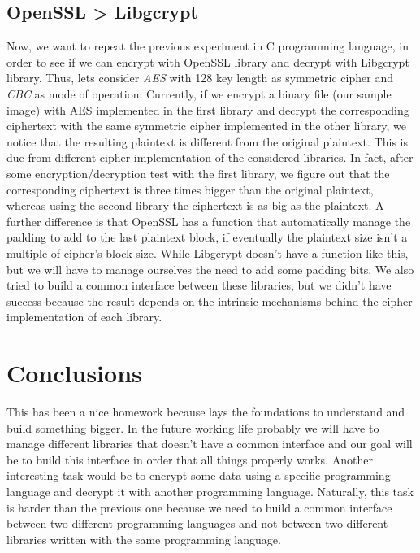 \documentclass[11pt]{article}
\begin{document}
\subsection{OpenSSL > Libgcrypt}
Now, we want to repeat the previous experiment in C programming language, in order to see if we can encrypt with OpenSSL library and decrypt with Libgcrypt library. Thus, lets consider \textit{AES} with 128 key length as symmetric cipher and \textit{CBC} as mode of operation. Currently, if we encrypt a binary file (our sample image) with AES implemented in the first library and decrypt the corresponding ciphertext with the same symmetric cipher implemented in the other library, we notice that the resulting plaintext is different from the original plaintext. This is due from different cipher implementation of the considered libraries. In fact, after some encryption/decryption test with the first library, we figure out that the corresponding ciphertext is three times bigger than the original plaintext, whereas using the second library the ciphertext is as big as the plaintext. A further difference is that OpenSSL has a function that automatically manage the padding to add to the last plaintext block, if eventually the plaintext size isn't a multiple of cipher's block size. While Libgcrypt doesn't have a function like this, but we will have to manage ourselves the need to add some padding bits. We also tried to build a common interface between these libraries, but we didn't have success because the result depends on the intrinsic mechanisms behind the cipher implementation of each library.
\section{Conclusions}
This has been a nice homework because lays the foundations to understand and build something bigger. In the future working life probably we will have to manage different libraries that doesn't have a common interface and our goal will be to build this interface in order that all things properly works. Another interesting task would be to encrypt some data using a specific programming language and decrypt it with another programming language. Naturally, this task is harder than the previous one because we need to build a common interface between two different programming languages and not between two different libraries written with the same programming language.
\end{document}
